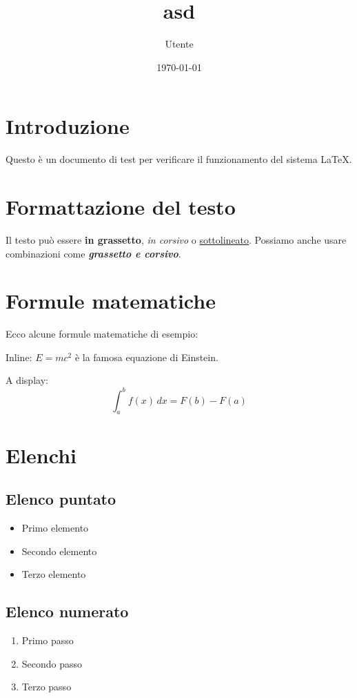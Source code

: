 \documentclass[12pt,a4paper]{article}
\title{asd}
\author{Utente}
\date{\today}
\begin{document}
\maketitle

\section{Introduzione}
Questo è un documento di test per verificare il funzionamento del sistema LaTeX.

\section{Formattazione del testo}
Il testo può essere \textbf{in grassetto}, \textit{in corsivo} o \underline{sottolineato}.
Possiamo anche usare combinazioni come \textit{\textbf{grassetto e corsivo}}.

\section{Formule matematiche}
Ecco alcune formule matematiche di esempio:

Inline: $E=mc^2$ è la famosa equazione di Einstein.

A display:
\begin{equation}
    \int_{a}^{b} f(x) \, dx = F(b) - F(a)
\end{equation}

\section{Elenchi}

\subsection{Elenco puntato}
\begin{itemize}
    \item Primo elemento
    \item Secondo elemento
    \item Terzo elemento
\end{itemize}

\subsection{Elenco numerato}
\begin{enumerate}
    \item Primo passo
    \item Secondo passo
    \item Terzo passo
\end{enumerate}
\end{document}
